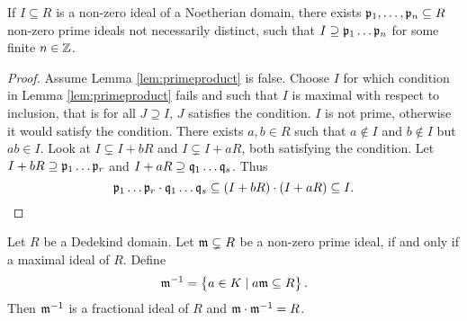 \begin{lemma}
\label{lem:primeproduct}
If $ I \subseteq R $ is a non-zero ideal of a Noetherian domain, there exists $ \mathfrak{p}_1, \dots, \mathfrak{p}_n \subseteq R $ non-zero prime ideals not necessarily distinct, such that $ I \supseteq \mathfrak{p}_1 \dots \mathfrak{p}_n $ for some finite $ n \in \mathbb{Z} $.
\end{lemma}

\begin{proof}
Assume Lemma \ref{lem:primeproduct} is false. Choose $ I $ for which condition in Lemma \ref{lem:primeproduct} fails and such that $ I $ is maximal with respect to inclusion, that is for all $ J \supseteq I $, $ J $ satisfies the condition. $ I $ is not prime, otherwise it would satisfy the condition. There exists $ a, b \in R $ such that $ a \notin I $ and $ b \notin I $ but $ ab \in I $. Look at $ I \subsetneq I + bR $ and $ I \subsetneq I + aR $, both satisfying the condition. Let $ I + bR \supseteq \mathfrak{p}_1 \dots \mathfrak{p}_r $ and $ I + aR \supseteq \mathfrak{q}_1 \dots \mathfrak{q}_s $.
Thus
$$ \pp_1 \dots \pp_r \cdot \qq_1 \dots \qq_s \subseteq \br{I + bR} \cdot \br{I + aR} \subseteq I. $$
\end{proof}


\begin{proposition}
\label{prop:inverse}
Let $ R $ be a Dedekind domain. Let $ \mathfrak{m} \subsetneq R $ be a non-zero prime ideal, if and only if a maximal ideal of $ R $. Define
$$ \mm^{-1} = \cbr{a \in K \mid a\mm \subseteq R}. $$
Then $ \mathfrak{m}^{-1} $ is a fractional ideal of $ R $ and $ \mathfrak{m} \cdot \mathfrak{m}^{-1} = R $.
\end{proposition}

